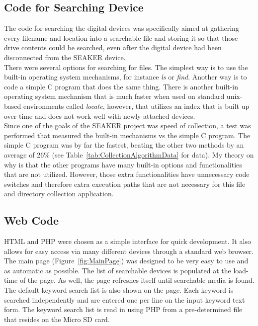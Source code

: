 \documentclass[12pt]{article}
\begin{document}
\subsection{Code for Searching Device}

The code for searching the digital devices was specifically aimed at gathering
every filename and location into a searchable file and storing it so that
those drive contents could be searched, even after the digital device had been
disconnected from the SEAKER device.\\

There were several options for searching for files.  The simplest way is to use
the built-in operating system mechanisms, for instance {\em ls} or {\em find}.
Another way is to code a simple C program that does the same thing.  There is
another built-in operating system mechanism that is much faster when used on
standard unix-based environments called {\em locate}, however, that utilizes
an index that is built up over time and does not work well with newly
attached devices.\\

Since one of the goals of the SEAKER project was speed of collection, a test
was performed that
measured the built-in mechanisms vs the simple C program.  The simple C program
was by far the fastest, beating the other two methods by an average of 26\%
(see Table~\ref{tab:CollectionAlgorithmData} for data).
My theory on why is that the other programs have many
built-in options and functionalities that are not utilized.  However,
those extra functionalities have unnecessary code switches and therefore extra
execution paths that are not necessary for this file and directory collection
application.\\

\subsection{Web Code}

HTML and PHP were chosen as a simple interface for quick development.  It also
allows for easy access via many different devices through a standard web 
browser.\\

The main page (Figure~\ref{fig:MainPage}) was designed to be very easy to use
and as automatic as possible.
The list of searchable devices is populated at the load-time of the page.  As
well, the page refreshes itself until searchable media is found.  The 
default keyword search list is also shown on the page.  Each keyword is
searched independently and are entered one per line on the input keyword
text form.  The keyword search list is read in using
PHP from a pre-determined file that resides on the Micro SD card.\\
\end{document}
